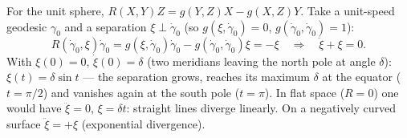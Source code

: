 \begin{example}
For the unit sphere, $R(X,Y)Z=g(Y,Z)X-g(X,Z)Y$. Take a unit-speed geodesic $\gamma_0$ and a separation $\xi\perp\dot\gamma_0$ (so $g(\xi,\dot\gamma_0)=0$, $g(\dot\gamma_0,\dot\gamma_0)=1$):
\[
R(\dot\gamma_0,\xi)\dot\gamma_0=g(\xi,\dot\gamma_0)\dot\gamma_0-g(\dot\gamma_0,\dot\gamma_0)\xi=-\xi\quad\Longrightarrow\quad\ddot\xi+\xi=0 .
\]
With $\xi(0)=0$, $\dot\xi(0)=\delta$ (two meridians leaving the north pole at angle $\delta$): $\xi(t)=\delta\sin t$ --- the separation grows, reaches its maximum $\delta$ at the equator ($t=\pi/2$) and vanishes again at the south pole ($t=\pi$). In flat space ($R=0$) one would have $\ddot\xi=0$, $\xi=\delta t$: straight lines diverge linearly. On a negatively curved surface $\ddot\xi=+\xi$ (exponential divergence).
\end{example}
